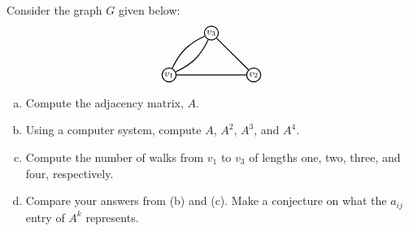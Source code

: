 \documentclass[11pt,letterpaper]{article}
\begin{document}
\newpage





 Consider the graph $G$ given below: 
	\[
	\graphSeven
	\] 

\begin{enumerate}[(a)]
\item Compute the adjacency matrix, $A$.
\item Using a computer system, compute $A$, $A^2$, $A^3$, and $A^4$. 
\item Compute the number of walks from $v_1$ to $v_3$ of lengths one, two, three, and four, respectively. 
\item Compare your answers from (b) and (c). Make a conjecture on what the $a_{ij}$ entry of $A^k$ represents. 
\end{enumerate} \pspace
\end{document}
